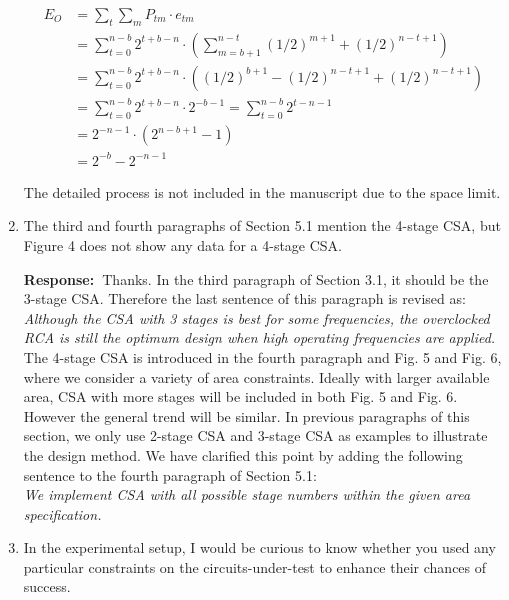 \documentclass[a4paper, 11pt]{article}
\def\Response{\noindent \textbf{Response:~}}
\newcommand{\Question}[1]{\textcolor[rgb]{0.51,0.00,0.00}{#1}}
\newcommand{\PaperText}[1]{\emph{#1}}
\begin{document}
\begin{enumerate}
      \begin{align*}
        E_O&=\sum_t\sum_m P_{tm}\cdot e_{tm}\\ &=\sum_{t=0}^{n-b}2^{t+b-n}\cdot\left(\sum_{m=b+1}^{n-t}(1/2)^{m+1}+(1/2)^{n-t+1}\right)\\
        &=\sum_{t=0}^{n-b}2^{t+b-n}\cdot\left((1/2)^{b+1}-(1/2)^{n-t+1}+(1/2)^{n-t+1}\right)\\
        &=\sum_{t=0}^{n-b}2^{t+b-n}\cdot2^{-b-1}=\sum_{t=0}^{n-b}2^{t-n-1}\\
        &=2^{-n-1}\cdot\left(2^{n-b+1}-1\right)\\
        &=2^{-b}-2^{-n-1}
      \end{align*}
      
      The detailed process is not included in the manuscript due to the space limit.
      
  \item \Question{The third and fourth paragraphs of Section 5.1 mention the 4-stage CSA, but Figure 4 does not show any data for a 4-stage CSA.}
      
      \Response Thanks. In the third paragraph of Section 3.1, it should be the 3-stage CSA. Therefore the last sentence of this paragraph is revised as:\\
      
      \PaperText{Although the CSA with 3 stages is best for some frequencies, the overclocked RCA is still the optimum design when high operating frequencies are applied.}\\
      
      The 4-stage CSA is introduced in the fourth paragraph and Fig. 5 and Fig. 6, where we consider a variety of area constraints. Ideally with larger available area, CSA with more stages will be included in both Fig. 5 and Fig. 6. However the general trend will be similar. In previous paragraphs of this section, we only use 2-stage CSA and 3-stage CSA as examples to illustrate the design method. We have clarified this point by adding the following sentence to the fourth paragraph of Section 5.1:\\
      
      \PaperText{We implement CSA with all possible stage numbers within the given area specification.}\\
      
  \item \Question{In the experimental setup, I would be curious to know whether you used any particular constraints on the circuits-under-test to enhance their chances of success.}
      

\end{enumerate}
\end{document}
